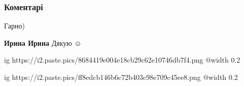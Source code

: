  
 
 
 
 
\subsubsection{Коментарі}

\begin{itemize} %
Гарно)

\textbf{Ирина Ирина} Дякую ☺ ️ 


\ifcmt
  ig https://i2.paste.pics/8684419e004e18cb29c62e10746db7f4.png
  @width 0.2
\fi


\ifcmt
  ig https://i2.paste.pics/ff8edcb146b6c72b403c98e709c45ee8.png
  @width 0.2
\fi

\end{itemize} %
